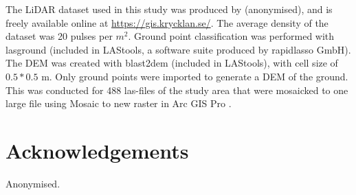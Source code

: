 \documentclass[]{interact}
\theoremstyle{plain}%
\theoremstyle{definition}
\theoremstyle{remark}
\begin{document}
\label{lidartodem}
The LiDAR dataset used in this study was produced by (anonymised), and is freely available online at \href{https://gis.krycklan.se/}{https://gis.krycklan.se/}. The average density of the dataset was 20 pulses per $m^2$.  Ground point classification was performed with lasground (included in LAStools, a software suite produced by rapidlasso GmbH). The DEM was created with blast2dem (included in LAStools),  with cell size of $0.5*0.5$ m. Only ground points were imported  to generate a DEM of the ground. This was conducted for 488 las-files of the study area that were mosaicked to one large file using Mosaic to new raster in Arc GIS Pro \citep{EsriArcGisBook}.

\section*{Acknowledgements}
Anonymised.



\label{references}



\end{document}
